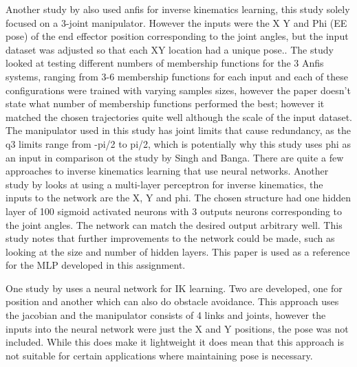 \documentclass[a4paper,11pt]{article}
\begin{document}
Another study by  \cite{anfis2} also used anfis for inverse kinematics learning, this study solely focused on a 3-joint manipulator. However the inputs were the X Y and Phi (EE pose) of the end effector position corresponding to the joint angles, but the input dataset was adjusted so that each XY location had a unique pose.. The study looked at testing different numbers of membership functions for the 3 Anfis systems, ranging from 3-6 membership functions for each input and each of these configurations were trained with varying samples sizes, however the paper doesn't state what number of membership functions performed the best; however it matched the chosen trajectories quite well although the scale of the input dataset. The manipulator used in this study has joint limits that cause redundancy, as the q3 limits range from -pi/2 to pi/2, which is potentially why this study uses phi as an input in comparison ot the study by Singh and Banga.
\newline
\newline
There are quite a few approaches to inverse kinematics learning that use neural networks.
Another study by \cite{mlp1}  looks at using a multi-layer perceptron for inverse kinematics, the inputs to the network are the X, Y and phi. The chosen structure had one hidden layer of 100 sigmoid activated neurons with 3 outputs neurons corresponding to the joint angles. The network can match the desired output arbitrary well. This study notes that further improvements to the network could be made, such as looking at the size and number of hidden layers. This paper is used as a reference for the MLP developed in this assignment. 

One study by \cite{nn1} uses a neural network for IK learning. Two are developed, one for position and another which can also do obstacle avoidance. This approach uses the jacobian and the manipulator consists of 4 links and joints, however the inputs into the neural network were just the X and Y positions, the pose was not included. While this does make it lightweight it does mean that this approach is not suitable for certain applications where maintaining pose is necessary.
\end{document}
